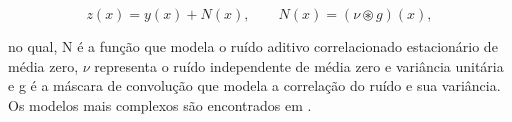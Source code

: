 \begin{equation}
z(x) =  y(x) + N(x), \qquad N(x) = (\nu\circledast g)(x),
\label{eq:eqCapRuidoCorrelatedNoiseStationary}
\end{equation}

\noindent no qual, N é a função que modela o ruído aditivo correlacionado estacionário de média zero, $\nu$ representa o ruído independente de média zero e variância unitária e g é a máscara de convolução que modela a correlação do ruído e sua variância. Os modelos mais complexos são encontrados em .





      



